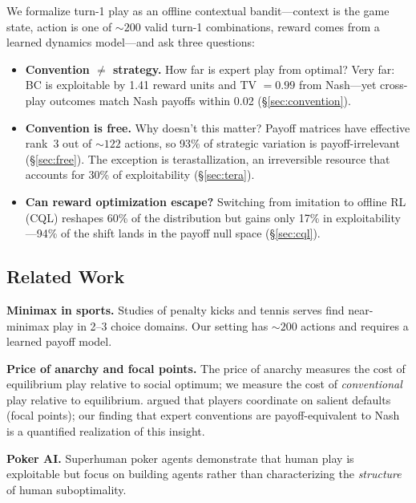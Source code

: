 \documentclass{article}
\begin{document}
We formalize turn-1 play as an offline contextual bandit---context is the
game state, action is one of ${\sim}200$ valid turn-1 combinations, reward
comes from a learned dynamics model---and ask three questions:

\begin{itemize}[nosep,leftmargin=*]
  \item \textbf{Convention $\neq$ strategy.} How far is expert play from
    optimal? Very far: BC is exploitable by 1.41 reward units and
    TV $= 0.99$ from Nash---yet cross-play outcomes match Nash payoffs
    within 0.02 (\S\ref{sec:convention}).
  \item \textbf{Convention is free.} Why doesn't this matter? Payoff
    matrices have effective rank~3 out of ${\sim}122$ actions, so 93\%
    of strategic variation is payoff-irrelevant (\S\ref{sec:free}). The
    exception is terastallization, an irreversible resource that accounts
    for 30\% of exploitability (\S\ref{sec:tera}).
  \item \textbf{Can reward optimization escape?} Switching from imitation
    to offline RL (CQL) reshapes 60\% of the distribution but gains only
    17\% in exploitability---94\% of the shift lands in the payoff null
    space (\S\ref{sec:cql}).
\end{itemize}

\subsection{Related Work}

\textbf{Minimax in sports.}
Studies of penalty kicks \citep{chiappori2002testing, palacios2003professionals} and tennis serves \citep{walker2001minimax, anderson2024professionals} find near-minimax play in 2--3 choice domains. Our setting has ${\sim}200$ actions and requires a learned payoff model.

\textbf{Price of anarchy and focal points.}
The price of anarchy \citep{koutsoupias1999worst, roughgarden2002bad} measures the cost of equilibrium play relative to social optimum; we measure the cost of \emph{conventional} play relative to equilibrium. \citet{schelling1960strategy} argued that players coordinate on salient defaults (focal points); our finding that expert conventions are payoff-equivalent to Nash is a quantified realization of this insight.

\textbf{Poker AI.}
Superhuman poker agents \citep{bowling2015heads, brown2019superhuman} demonstrate that human play is exploitable but focus on building agents rather than characterizing the \emph{structure} of human suboptimality.
\end{document}
